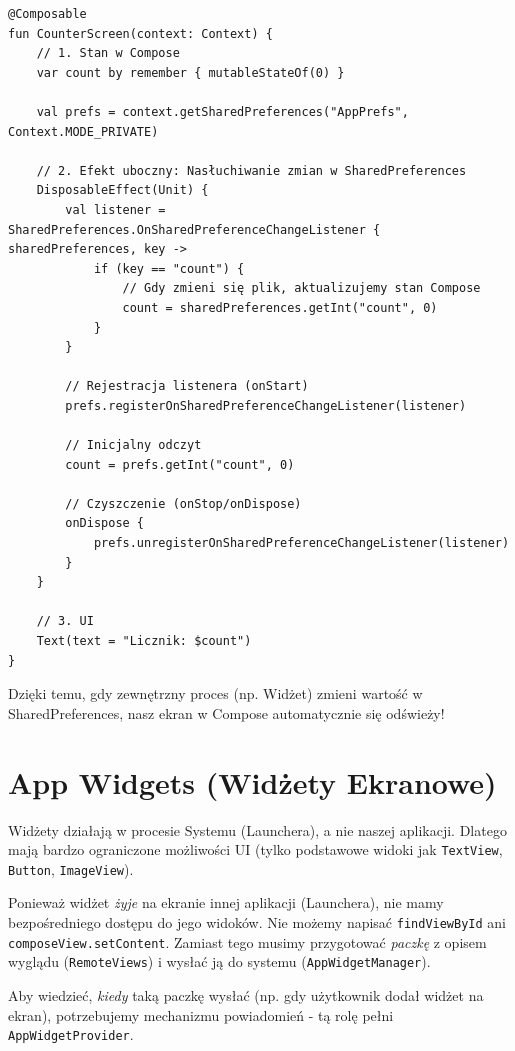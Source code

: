 \begin{verbatim}
@Composable
fun CounterScreen(context: Context) {
    // 1. Stan w Compose
    var count by remember { mutableStateOf(0) }
    
    val prefs = context.getSharedPreferences("AppPrefs", Context.MODE_PRIVATE)

    // 2. Efekt uboczny: Nasłuchiwanie zmian w SharedPreferences
    DisposableEffect(Unit) {
        val listener = SharedPreferences.OnSharedPreferenceChangeListener { sharedPreferences, key ->
            if (key == "count") {
                // Gdy zmieni się plik, aktualizujemy stan Compose
                count = sharedPreferences.getInt("count", 0)
            }
        }

        // Rejestracja listenera (onStart)
        prefs.registerOnSharedPreferenceChangeListener(listener)
        
        // Inicjalny odczyt
        count = prefs.getInt("count", 0)

        // Czyszczenie (onStop/onDispose)
        onDispose {
            prefs.unregisterOnSharedPreferenceChangeListener(listener)
        }
    }

    // 3. UI
    Text(text = "Licznik: $count")
}
\end{verbatim}

Dzięki temu, gdy zewnętrzny proces (np. Widżet) zmieni wartość w SharedPreferences, nasz ekran w Compose automatycznie się odświeży!

\section{App Widgets (Widżety Ekranowe)}

Widżety działają w procesie Systemu (Launchera), a nie naszej aplikacji. Dlatego mają bardzo ograniczone możliwości UI (tylko podstawowe widoki jak \texttt{TextView}, \texttt{Button}, \texttt{ImageView}).

Ponieważ widżet \textit{żyje} na ekranie innej aplikacji (Launchera), nie mamy bezpośredniego dostępu do jego widoków. Nie możemy napisać \texttt{findViewById} ani \texttt{composeView.setContent}. Zamiast tego musimy przygotować \textit{paczkę} z opisem wyglądu (\texttt{RemoteViews}) i wysłać ją do systemu (\texttt{AppWidgetManager}).

Aby wiedzieć, \textit{kiedy} taką paczkę wysłać (np. gdy użytkownik dodał widżet na ekran), potrzebujemy mechanizmu powiadomień - tą rolę pełni \texttt{AppWidgetProvider}.

